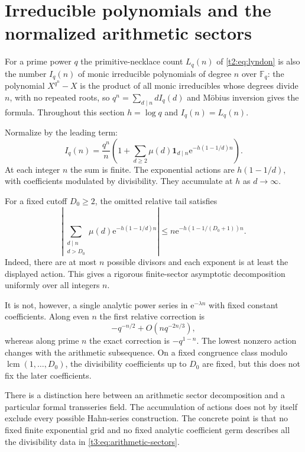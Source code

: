 \documentclass[11pt,openany]{book}
\numberwithin{equation}{chapter}
\theoremstyle{plain}
\theoremstyle{definition}
\theoremstyle{remark}
\newcommand{\ee}{\mathrm e}
\newcommand{\F}{\mathbb F}
\newcommand{\one}{\mathbf 1}
\begin{document}
\section{Irreducible polynomials and the normalized arithmetic sectors}
\label{ct:sec:irreducibles}

For a prime power $q$ the primitive-necklace count $L_q(n)$ of
\cref{t2:eq:lyndon} is also the number $I_q(n)$ of monic irreducible
polynomials of degree $n$ over $\F_q$: the polynomial $X^{q^n}-X$ is the
product of all monic irreducibles whose degrees divide $n$, with no repeated
roots, so $q^n=\sum_{d\mid n}dI_q(d)$ and M\"obius inversion gives the
formula.  Throughout this section $h=\log q$ and $I_q(n)=L_q(n)$.

Normalize by the leading term:
\begin{equation}\label{t3:eq:arithmetic-sectors}
 I_q(n)=\frac{q^n}{n}
 \left(1+\sum_{d\ge2}\mu(d)\one_{d\mid n}
       \ee^{-h(1-1/d)n}\right).
\end{equation}
At each integer $n$ the sum is finite. The exponential actions are
$h(1-1/d)$, with coefficients modulated by divisibility. They accumulate at $h$ as $d\to\infty$.

For a fixed cutoff $D_0\ge2$, the omitted relative tail satisfies
\begin{equation}\label{t3:eq:arithmetic-cutoff}
 \left|\sum_{\substack{d\mid n\\d>D_0}}
       \mu(d)\ee^{-h(1-1/d)n}\right|
 \le n\ee^{-h(1-1/(D_0+1))n}.
\end{equation}
Indeed, there are at most $n$ possible divisors and each exponent is at least the displayed action. This gives a rigorous finite-sector asymptotic decomposition uniformly over all integers $n$.

It is not, however, a single analytic power series in $\ee^{-\lambda n}$ with fixed constant coefficients. Along even $n$ the first relative correction is
\[
 -q^{-n/2}+O(nq^{-2n/3}),
\]
whereas along prime $n$ the exact correction is $-q^{1-n}$. The lowest nonzero action changes with the arithmetic subsequence. On a fixed congruence class modulo $\operatorname{lcm}(1,\ldots,D_0)$, the divisibility coefficients up to $D_0$ are fixed, but this does not fix the later coefficients.

There is a distinction here between an arithmetic sector decomposition and a particular formal transseries field. The accumulation of actions does not by itself exclude every possible Hahn-series construction. The concrete point is that no fixed finite exponential grid and no fixed analytic coefficient germ describes all the divisibility data in \eqref{t3:eq:arithmetic-sectors}.
\end{document}
